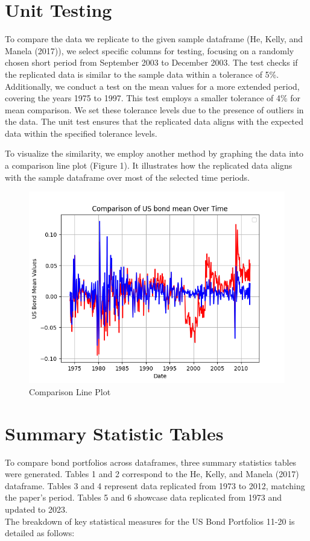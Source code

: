 \documentclass{article}
\begin{document}
\section{ Unit Testing}

To compare the data we replicate to the given sample dataframe (He, Kelly, and Manela (2017)),  we select specific columns for testing, focusing on a randomly chosen short period from September 2003 to December 2003. The test checks if the replicated data is similar to the sample data within a tolerance of 5\%. Additionally, we conduct a test on the mean values for a more extended period, covering the years 1975 to 1997. This test employs a smaller tolerance of 4\% for mean comparison. We set these tolerance levels due to the presence of outliers in the data. The unit test ensures that the replicated data aligns with the expected data within the specified tolerance levels.

To visualize the similarity, we employ another method by graphing the data into a comparison line plot (Figure 1). It illustrates how the replicated data aligns with the sample dataframe over most of the selected time periods.

\begin{figure} [h]
    \centering
    \includegraphics[width=0.75\linewidth]{output/comparison_lineplot.png}
    \caption{Comparison Line Plot}
    \label{fig:comparison plot}
\end{figure}
\clearpage  %

\section{ Summary Statistic Tables}
To compare bond portfolios across dataframes, three summary statistics tables were generated. Tables 1 and 2 correspond to the He, Kelly, and Manela (2017) dataframe. Tables 3 and 4 represent data replicated from 1973 to 2012, matching the paper's period. Tables 5 and 6 showcase data replicated from 1973 and updated to 2023.  
\\
The breakdown of key statistical measures for the US Bond Portfolios 11-20 is detailed as follows: 
\end{document}
